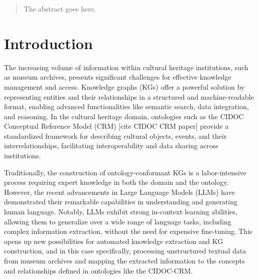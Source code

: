 \documentclass[a4, conference]{IEEEtran}
\begin{document}




\maketitle

\begin{abstract}
    The abstract goes here.
\end{abstract}





%
\IEEEpeerreviewmaketitle



\section{Introduction}

The increasing volume of information within cultural heritage institutions, such as museum archives, presents significant challenges for effective knowledge management and access. Knowledge graphs (KGs) offer a powerful solution by representing entities and their relationships in a structured and machine-readable format, enabling advanced functionalities like semantic search, data integration, and reasoning. In the cultural heritage domain, ontologies such as the CIDOC Conceptual Reference Model (CRM) [cite CIDOC CRM paper] provide a standardized framework for describing cultural objects, events, and their interrelationships, facilitating interoperability and data sharing across institutions.

Traditionally, the construction of ontology-conformant KGs is a labor-intensive process requiring expert knowledge in both the domain and the ontology. However, the recent advancements in Large Language Models (LLMs) have demonstrated their remarkable capabilities in understanding and generating human language. Notably, LLMs exhibit strong in-context learning abilities, allowing them to generalize over a wide range of language tasks, including complex information extraction, without the need for expensive fine-tuning. This opens up new possibilities for automated knowledge extraction and KG construction, and in this case specifically, processing unstructured textual data from museum archives and mapping the extracted information to the concepts and relationships defined in ontologies like the CIDOC-CRM.
\end{document}
